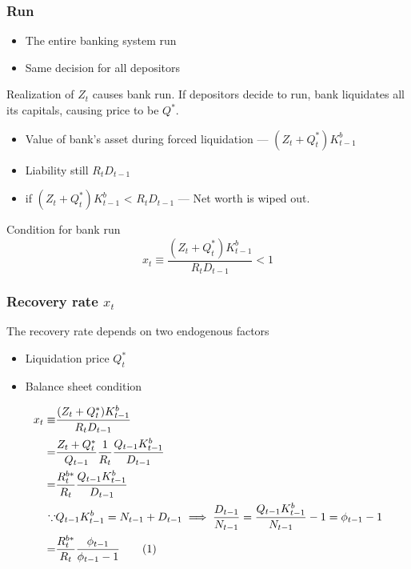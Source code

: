 \begin{frame}
    \frametitle{Run}

    \begin{itemize}
        \item The entire banking system run
        \item Same decision for all depositors
    \end{itemize}
    \vfill
    Realization of $Z_t$ causes bank run. If depositors decide to run, bank liquidates all its capitals, 
    causing price to be $Q^*$.
    \begin{itemize}
        \item Value of bank's asset during forced liquidation --- $(Z_t + Q^*_t)K^b_{t-1}$
        \item Liability still $R_t D_{t-1}$
        \item if $(Z_t + Q^*_t)K^b_{t-1}$ < $R_t D_{t-1}$ --- Net worth is wiped out.
    \end{itemize}    
    Condition for bank run 
    \begin{equation}
        x_t \equiv \frac{(Z_t + Q^*_t)K^b_{t-1}}{R_t D_{t-1}} < 1
    \end{equation}
\end{frame}

\begin{frame}
    \frametitle{Recovery rate $x_t$}
    
    The recovery rate depends on two endogenous factors
    \begin{itemize}
        \item Liquidation price $Q^*_t$
        \item Balance sheet condition
    \end{itemize}
    
    \begin{align*}
        x_t \equiv& \frac{(Z_t + Q^*_t)K^b_{t-1}}{R_t D_{t-1}} \\
        =& \frac{Z_t + Q^*_t}{Q_{t-1}} \frac{1}{R_t} \frac{Q_{t-1}K^b_{t-1}}{D_{t-1}} \\
        =& \frac{R^{b*}_t}{R_t} \frac{Q_{t-1}K^b_{t-1}}{D_{t-1}}\\
        \because& Q_{t-1}K^b_{t-1} = N_{t-1} + D_{t-1} \implies \frac{D_{t-1}}{N_{t-1}} = \frac{Q_{t-1}K^b_{t-1}}{N_{t-1}} - 1 = \phi_{t-1} - 1 \\
        =& \frac{R^{b*}_t}{R_t}\frac{\phi_{t-1}}{\phi_{t-1} - 1 } \addtocounter{equation}{1}\tag{\theequation}
    \end{align*}
\end{frame}

